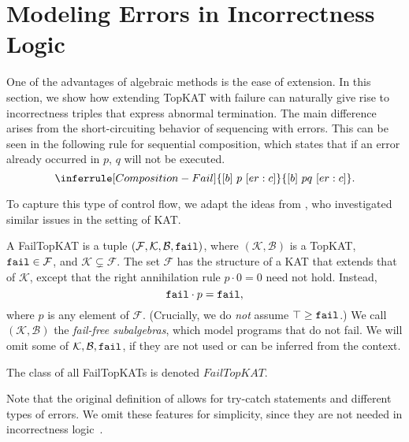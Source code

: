 \section{Modeling Errors in Incorrectness Logic}\label{sec: failkat and error}

One of the advantages of algebraic methods is the ease of extension.
In this section, we show how extending TopKAT with failure can naturally give 
rise to incorrectness triples that express abnormal termination.  
The main difference arises from the short-circuiting behavior of sequencing with errors.
This can be seen in the following rule for sequential composition, which states
that if an error already occurred in \(p\), \(q\) will not be executed.
\[
\inferrule[Composition-Fail]
{ \incorTriple{b}{p}{\errState: c}}
{ \incorTriple{b}{pq}{\errState: c}}.
\]

To capture this type of control flow, we adapt the ideas from
\citet{Mamouras_2017}, who investigated similar issues
in the setting of KAT\@.
\begin{definition}[FailTopKAT]
  A FailTopKAT is a tuple \((\mathcal{F},\mathcal{K},\mathcal{B},\mathtt{fail})\), where
  \((\mathcal{K}, \mathcal{B})\) is a TopKAT, \(\mathtt{fail} \in \mathcal{F}\), and
  \(\mathcal{K} \subsetneq \mathcal{F}\). The set \(\mathcal{F}\) has the
  structure of a KAT that extends that of \(\mathcal{K}\), except that the right
  annihilation rule \(p \cdot 0 = 0\) need not hold.  Instead,
  \[\mathtt{fail} \cdot p = \mathtt{fail},\] where \(p\) is any element of \(\mathcal{F}\).
  (Crucially, we do \emph{not} assume \(\top \geq \mathtt{fail}\).) We call
  \((\mathcal{K},\mathcal{B})\) the \emph{fail-free subalgebras}, 
  which model programs that do not fail.  
  We will omit some of \(\mathcal{K},\mathcal{B},\mathtt{fail}\),
  if they are not used or can be inferred from the context.

  The class of all FailTopKATs is denoted \(FailTopKAT\).
\end{definition}
Note that the original definition of \citet{Mamouras_2017} allows for try-catch statements and different types of errors.  
We omit these features for simplicity, since they are not needed in incorrectness logic~\cite{OHearn_2020}. 

